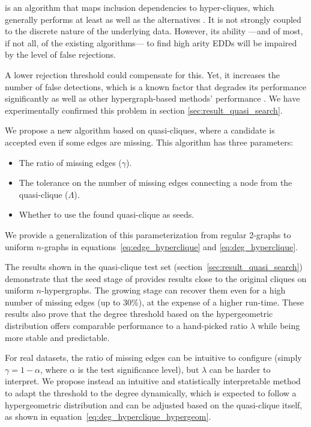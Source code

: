 \Find is an algorithm that maps inclusion dependencies to hyper-cliques,
which generally performs  at least as well as the alternatives \cite{Dursch2019}.
It is not strongly coupled to the discrete nature of the underlying data.
However, its ability ---and of most, if not all, of the existing algorithms--- to find
high arity EDDs will be impaired by the level of false rejections.

A lower rejection threshold could compensate for this. Yet, it increases the number
of false detections, which is a known factor that degrades
its performance significantly as well as other hypergraph-based methods' performance  \cite{koeller2006heuristic}.
We have experimentally confirmed this problem in section \ref{sec:result_quasi_search}.

We propose a new algorithm based on quasi-cliques, where a candidate is accepted
even if some edges are missing. This algorithm has three parameters:

\begin{itemize}
    \item The ratio of missing edges ($\gamma$).
    \item The tolerance on the number of missing edges connecting a node from the quasi-clique ($\Lambda$).
    \item Whether to use the found quasi-clique as seeds.
\end{itemize}

We provide a generalization of this parameterization from regular 2-graphs
\cite{brunato2007effectively} to uniform $n$-graphs in equations~\ref{eq:edge_hyperclique}
and \ref{eq:deg_hyperclique}.

The results shown in the quasi-clique test set (section~\ref{sec:result_quasi_search})
demonstrate that the seed stage of \PresQ provides results close to the original
cliques on uniform $n$-hypergraphs. The growing stage
can recover them even for a high number of missing edges (up to $30\%$), at the expense of a higher run-time.
These results also prove that the degree threshold based on the hypergeometric distribution
offers comparable performance to a hand-picked ratio $\lambda$
while being more stable and predictable.

For real datasets, the ratio of missing edges can be intuitive to configure
(simply $\gamma = 1 - \alpha$, where $\alpha$ is the test significance level), 
but $\lambda$ can be harder to interpret. We propose instead an intuitive and statistically
interpretable method to adapt the threshold to the degree dynamically, which is expected
to follow a hypergeometric distribution and can be adjusted based on the quasi-clique
itself, as shown in equation~\ref{eq:deg_hyperclique_hypergeom}.

